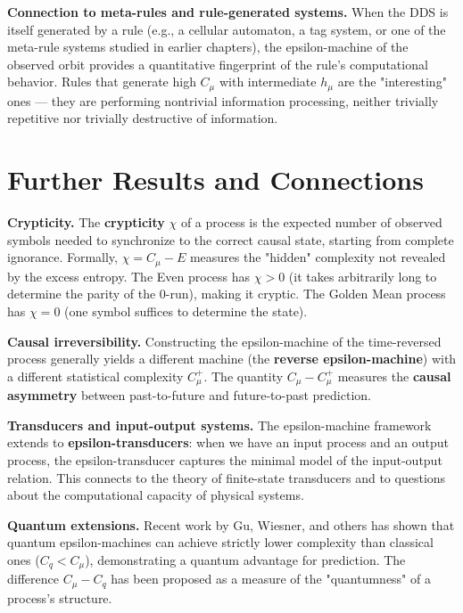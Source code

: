 \textbf{Connection to meta-rules and rule-generated systems.} When the DDS is itself generated by a rule (e.g., a cellular automaton, a tag system, or one of the meta-rule systems studied in earlier chapters), the epsilon-machine of the observed orbit provides a quantitative fingerprint of the rule's computational behavior. Rules that generate high $C_\mu$ with intermediate $h_\mu$ are the "interesting" ones --- they are performing nontrivial information processing, neither trivially repetitive nor trivially destructive of information.



\section{Further Results and Connections}

\textbf{Crypticity.} The \textbf{crypticity} $\chi$ of a process is the expected number of observed symbols needed to synchronize to the correct causal state, starting from complete ignorance. Formally, $\chi = C_\mu - E$ measures the "hidden" complexity not revealed by the excess entropy. The Even process has $\chi > 0$ (it takes arbitrarily long to determine the parity of the $0$-run), making it cryptic. The Golden Mean process has $\chi = 0$ (one symbol suffices to determine the state).

\textbf{Causal irreversibility.} Constructing the epsilon-machine of the time-reversed process generally yields a different machine (the \textbf{reverse epsilon-machine}) with a different statistical complexity $C_\mu^+$. The quantity $C_\mu - C_\mu^+$ measures the \textbf{causal asymmetry} between past-to-future and future-to-past prediction.

\textbf{Transducers and input-output systems.} The epsilon-machine framework extends to \textbf{epsilon-transducers}: when we have an input process and an output process, the epsilon-transducer captures the minimal model of the input-output relation. This connects to the theory of finite-state transducers and to questions about the computational capacity of physical systems.

\textbf{Quantum extensions.} Recent work by Gu, Wiesner, and others has shown that quantum epsilon-machines can achieve strictly lower complexity than classical ones ($C_q < C_\mu$), demonstrating a quantum advantage for prediction. The difference $C_\mu - C_q$ has been proposed as a measure of the "quantumness" of a process's structure.



